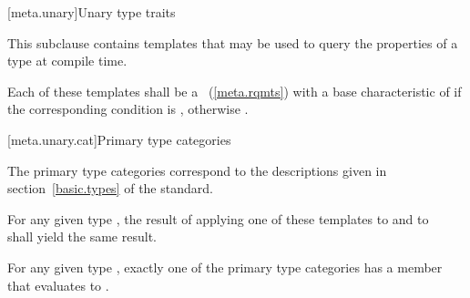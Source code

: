 [meta.unary]{Unary type traits}

\pnum
This subclause contains templates that may be used to query the
properties of a type at compile time.

\pnum
Each of these templates shall be a
~(\ref{meta.rqmts})
with a base characteristic of
 if the corresponding condition is , otherwise
.

[meta.unary.cat]{Primary type categories}

\pnum
The primary type categories correspond to the descriptions given in
section~\ref{basic.types} of the \Cpp standard.

\pnum
For any given type , the result of applying one of these templates to
 and to \cv{}~ shall yield the same result.

\pnum
\begin{note}
For any given type , exactly one of the primary type categories
has a  member that evaluates to .
\end{note}

